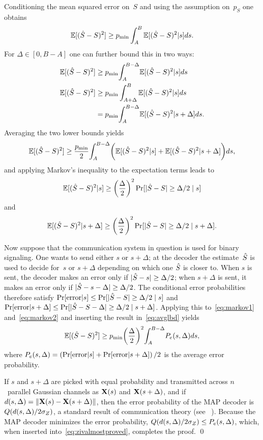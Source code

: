 \begin{subappendices}
  Conditioning the mean squared error on~$S$ and using the assumption on~$p_S$
  one obtains
  \begin{equation*}
    {\mathbb{E}[({\hat{S}}- S)^2]} \ge {p_{\min}} \int_A^B {\mathbb{E}[({\hat{S}} - S)^2 | s]} ds.
  \end{equation*}
  For $\Delta \in [0, B-A]$ one can further bound this in two ways:
  \begin{align*}
    {\mathbb{E}[({\hat{S}}- S)^2]} &\ge {p_{\min}} {\int_A^{B-\Delta}} {\mathbb{E}[({\hat{S}}- S)^2 | s]} ds \\
    {\mathbb{E}[({\hat{S}} - S)^2]} &\ge {p_{\min}} \int_{A+\Delta}^B {\mathbb{E}[({\hat{S}} - S)^2 | s]} ds \\
    &= {p_{\min}} {\int_A^{B-\Delta}} {\mathbb{E}[({\hat{S}} - S)^2 | s + \Delta]} ds.
  \end{align*}
  Averaging the two lower bounds yields
  \begin{equation}
    \label{eq:avglbd}
    {\mathbb{E}[({\hat{S}}- S)^2]} \ge \frac{{p_{\min}}}{2} {\int_A^{B-\Delta}} \bigg( {\mathbb{E}[({\hat{S}} - S)^2 | s]} + \\
    {\mathbb{E}[({\hat{S}} - S)^2 | s + \Delta]} \bigg) ds,
  \end{equation}
  and applying Markov's inequality to the expectation terms leads to
  \begin{equation}
    \label{eq:markov1}
    {\mathbb{E}[({\hat{S}}- S)^2 | s]} \ge {\left(\frac{\Delta}{2}\right)^2} \Pr[|{\hat{S}} - S| \ge \Delta/2 \mid s]
  \end{equation}
  and
  \begin{equation}
    \label{eq:markov2}
    {\mathbb{E}[({\hat{S}}- S)^2 | s + \Delta]} \ge {\left(\frac{\Delta}{2}\right)^2} \Pr[|{\hat{S}} - S| \ge \Delta/2 \mid s+\Delta].
  \end{equation}

  Now suppose that the communication system in question is used for binary
  signaling. One wants to send either $s$ or $s+\Delta$; at the decoder the
  estimate~${\hat{S}}$ is used to decide for~$s$ or $s + \Delta$ depending on which
  one ${\hat{S}}$ is closer to. When $s$ is sent, the decoder makes an error only if
  $|{\hat{S}} - s| \ge \Delta/2$; when $s + \Delta$ is sent, it makes an error only if
  $|{\hat{S}} - s - \Delta| \ge \Delta/2$. The conditional error probabilities
  therefore satisfy $\Pr[\text{error} | s] \le \Pr[|{\hat{S}} - S| \ge \Delta/2 \mid
  s]$ and $\Pr[\text{error} | s + \Delta] \le \Pr[|{\hat{S}} - S - \Delta| \ge
  \Delta/2 \mid s + \Delta]$. Applying this to~\eqref{eq:markov1}
  and~\eqref{eq:markov2} and inserting the result in~\eqref{eq:avglbd} yields
  \begin{equation}
    \label{eq:zivalmostproved}
    {\mathbb{E}[({\hat{S}}- S)^2]} \ge {p_{\min}} {\left(\frac{\Delta}{2}\right)^2} {\int_A^{B-\Delta}} P_e(s, \Delta) ds,
  \end{equation}
  where $P_e(s, \Delta) = \left(\Pr[\text{error}|s] + \Pr[\text{error}|s +
  \Delta] \right)/2$ is the average error probability.

  If $s$ and $s+\Delta$ are picked with equal probability and transmitted across
  $n$~parallel Gaussian channels as $\mathbf{X}(s)$ and $\mathbf{X}(s+\Delta)$, and if $d(s,
  \Delta) = \| \mathbf{X}(s) - \mathbf{X}(s + \Delta)\|$, then the error probability of the MAP
  decoder is $Q(d(s,\Delta) / 2 {\sigma_Z})$, a standard result of communication theory
  (see \eg~\cite[Section~4.5]{WozencraftJ1965}). Because the MAP decoder minimizes
  the error probability, $Q(d(s,\Delta)/2{\sigma_Z}) \le P_e(s,\Delta)$, which, when
  inserted into~\eqref{eq:zivalmostproved}, completes the proof. \hfill\qed




\end{subappendices}

